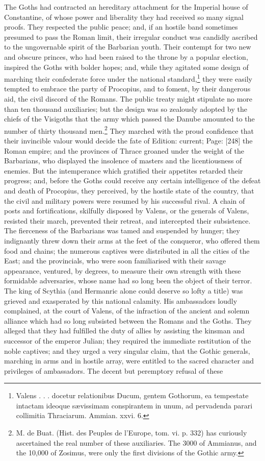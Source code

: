 The Goths had contracted an hereditary attachment for the Imperial house of Constantine, of whose power and liberality they had received so many signal proofs. They respected the public peace; and, if an hostile band sometimes presumed to pass the Roman limit, their irregular conduct was candidly ascribed to the ungovernable spirit of the Barbarian youth. Their contempt for two new and obscure princes, who had been raised to the throne by a popular election, inspired the Goths with bolder hopes; and, while they agitated some design of marching their confederate force under the national standard,\footnote{Valens . . . docetur relationibus Ducum, gentem Gothorum, ea tempestate intactam ideoque sævissimam conspirantem in unum, ad pervadenda parari collimitia Thraciarum. Ammian. xxvi. 6.} they were easily tempted to embrace the party of Procopius, and to foment, by their dangerous aid, the civil discord of the Romans. The public treaty might stipulate no more than ten thousand auxiliaries; but the design was so zealously adopted by the chiefs of the Visigoths that the army which passed the Danube amounted to the number of thirty thousand men.\footnote{M. de Buat. (Hist. des Peuples de l\texthebrew{}’Europe, tom. vi. p. 332) has curiously ascertained the real number of these auxiliaries. The 3000 of Ammianus, and the 10,000 of Zosimus, were only the first divisions of the Gothic army.} They marched with the proud confidence that their invincible valour would decide the fate of Edition: current; Page: [248] the Roman empire; and the provinces of Thrace groaned under the weight of the Barbarians, who displayed the insolence of masters and the licentiousness of enemies. But the intemperance which gratified their appetites retarded their progress; and, before the Goths could receive any certain intelligence of the defeat and death of Procopius, they perceived, by the hostile state of the country, that the civil and military powers were resumed by his successful rival. A chain of posts and fortifications, skilfully disposed by Valens, or the generals of Valens, resisted their march, prevented their retreat, and intercepted their subsistence. The fierceness of the Barbarians was tamed and suspended by hunger; they indignantly threw down their arms at the feet of the conqueror, who offered them food and chains; the numerous captives were distributed in all the cities of the East; and the provincials, who were soon familiarised with their savage appearance, ventured, by degrees, to measure their own strength with these formidable adversaries, whose name had so long been the object of their terror. The king of Scythia (and Hermanric alone could deserve so lofty a title) was grieved and exasperated by this national calamity. His ambassadors loudly complained, at the court of Valens, of the infraction of the ancient and solemn alliance which had so long subsisted between the Romans and the Goths. They alleged that they had fulfilled the duty of allies by assisting the kinsman and successor of the emperor Julian; they required the immediate restitution of the noble captives; and they urged a very singular claim, that the Gothic generals, marching in arms and in hostile array, were entitled to the sacred character and privileges of ambassadors. The decent but peremptory refusal of these 
